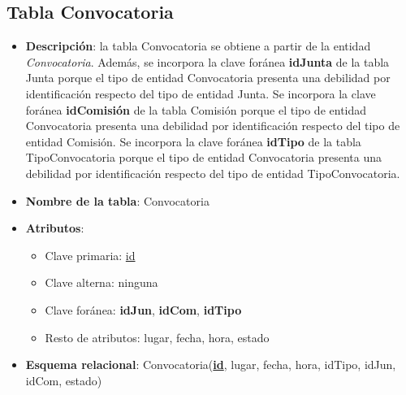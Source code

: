 \subsection{Tabla Convocatoria}
    \begin{itemize}
        \item \textbf{Descripción}: la tabla Convocatoria se obtiene a partir de la entidad \textit{Convocatoria}. Además, se incorpora la clave foránea \textbf{idJunta} de la tabla Junta porque el tipo de entidad Convocatoria presenta una debilidad por identificación respecto del tipo de entidad Junta. Se incorpora la clave foránea \textbf{idComisión} de la tabla Comisión porque el tipo de entidad Convocatoria presenta una debilidad por identificación respecto del tipo de entidad Comisión. Se incorpora la clave foránea \textbf{idTipo} de la tabla TipoConvocatoria porque el tipo de entidad Convocatoria presenta una debilidad por identificación respecto del tipo de entidad TipoConvocatoria.
        \item \textbf{Nombre de la tabla}: Convocatoria
        \item \textbf{Atributos}:
            \begin{itemize}
                \item Clave primaria: \underline{id}
                \item Clave alterna: ninguna
                \item Clave foránea: \textbf{idJun}, \textbf{idCom}, \textbf{idTipo}
                \item Resto de atributos: lugar, fecha, hora, estado
            \end{itemize}
        \item \textbf{Esquema relacional}: 
            Convocatoria(\textbf{\underline{id}}, lugar, fecha, hora, idTipo, idJun, idCom, estado)
    \end{itemize}

